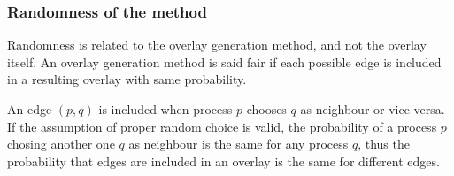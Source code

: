 \subsubsection{Randomness of the method}

Randomness is related to the overlay generation method, and not the overlay itself.  An overlay generation method is said fair if each possible edge is included in a resulting overlay with same probability. 

An edge $(p,q)$ is included when process $p$ chooses $q$ as neighbour or vice-versa. If the assumption of proper random choice is valid, the probability of a process $p$ chosing another one $q$ as neighbour is the same for any process $q$, thus the probability that edges are included in an overlay is the same for different edges.







